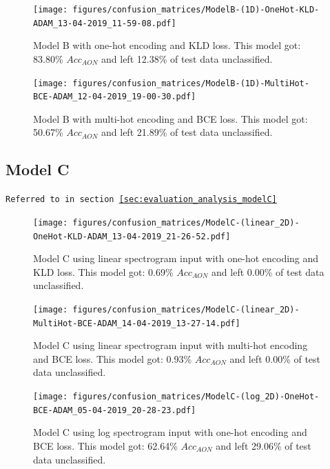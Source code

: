 \begin{appendices}
            \begin{figure}[H]
                \centering
                \texttt{[image: figures/confusion\_matrices/ModelB-(1D)-OneHot-KLD-ADAM\_13-04-2019\_11-59-08.pdf]}
                \caption*{Model B with one-hot encoding and KLD loss. This model got:  83.80\% $Acc_{AON}$ and left 12.38\% of test data unclassified.}
            \end{figure}
            
            \begin{figure}[H]
                \centering
                \texttt{[image: figures/confusion\_matrices/ModelB-(1D)-MultiHot-BCE-ADAM\_12-04-2019\_19-00-30.pdf]}
                \caption*{Model B with multi-hot encoding and BCE loss. This model got: 50.67\% $Acc_{AON}$ and left 21.89\% of test data unclassified.}
            \end{figure}
        \newpage
        \subsection{Model C}
        \label{app:modelC_confusion_matrix}
        \texttt{Referred to in section \ref{sec:evaluation_analysis_modelC}}
            \begin{figure}[H]
                \centering
                \texttt{[image: figures/confusion\_matrices/ModelC-(linear\_2D)-OneHot-KLD-ADAM\_13-04-2019\_21-26-52.pdf]}
                \caption*{Model C using linear spectrogram input with one-hot encoding and KLD loss. This model got:  0.69\% $Acc_{AON}$ and left 0.00\% of test data unclassified.}
            \end{figure}
            
            \begin{figure}[H]
                \centering
                \texttt{[image: figures/confusion\_matrices/ModelC-(linear\_2D)-MultiHot-BCE-ADAM\_14-04-2019\_13-27-14.pdf]}
                \caption*{Model C using linear spectrogram input with multi-hot encoding and BCE loss. This model got:  0.93\% $Acc_{AON}$ and left 0.00\% of test data unclassified.}
            \end{figure}
    
            \begin{figure}[H]
                \centering
                \texttt{[image: figures/confusion\_matrices/ModelC-(log\_2D)-OneHot-BCE-ADAM\_05-04-2019\_20-28-23.pdf]}
                \caption*{Model C using log spectrogram input with one-hot encoding and BCE loss. This model got: 62.64\% $Acc_{AON}$ and left 29.06\% of test data unclassified.}
            \end{figure}
            

\end{appendices}
